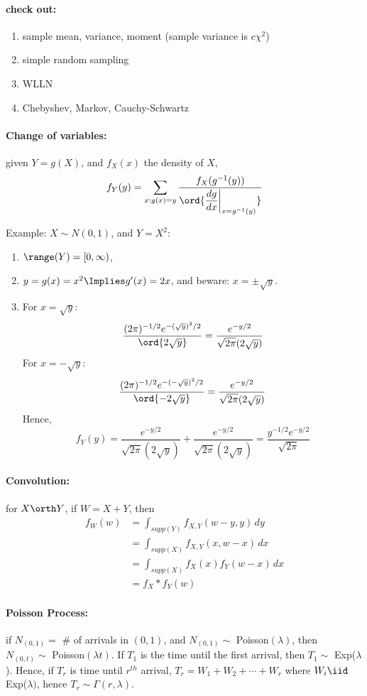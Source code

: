 \documentclass[10pt]{article}
\begin{document}
 \begin{multicols}{2}
\paragraph{check out:} 
\begin{enumerate}
\item sample mean, variance, moment (sample variance is $c \chi^{2}$)
\item simple random sampling
\item WLLN
\item Chebyshev, Markov, Cauchy-Schwartz
\end{enumerate}

\paragraph{Change of variables:} given $Y = g(X)$, and $f_{X}(x)$ the density of $X$, 
\[
f_{Y}(y) = \sum_{x : g(x) = y} \frac{f_{X}(g^{-1}(y))}{\ord{\dfrac{dg}{dx}\biggr|_{x=g^{-1}(y)}}}
\]

Example: $X \sim N(0,1)$, and $Y = X^2$:
\begin{enumerate}
\item $\range(Y) = [0,\infty)$,
\item $y=g(x) = x^2 \Implies g'(x) = 2x$, and beware: $x = \pm \sqrt{y}$.
\item For $x  = \sqrt{y}$:
\[
\frac{(2\pi)^{-1/2} e^{-(\sqrt{y})^2/2}}{\ord{2 \sqrt{y}}} = \frac{e^{-y/2}}{\sqrt{2\pi}(2\sqrt{y})}
\]
For $x = -\sqrt{y}$:
\[
 \frac{(2\pi)^{-1/2} e^{-(-\sqrt{y})^2/2}}{\ord{-2 \sqrt{y}}} = \frac{e^{-y/2}}{\sqrt{2\pi}(2\sqrt{y})}
\]
Hence,
\[
f_{Y}(y) = \frac{e^{-y/2}}{\sqrt{2\pi}(2\sqrt{y})} + \frac{e^{-y/2}}{\sqrt{2\pi}(2\sqrt{y})} = \frac{y^{-1/2}e^{-y/2}}{\sqrt{2\pi}} 
\]
\end{enumerate}

\paragraph{Convolution:} for $X \orth Y$, if $W = X+Y$, then
\begin{align*}
f_{W}(w) &= \int_{supp(Y)}f_{X,Y}(w-y,y) \, dy \\
 &= \int_{supp(X)}f_{X,Y}(x,w-x) \, dx \\
&= \int_{supp(X)}f_{X}(x)f_{Y}(w-x) \, dx \\
&= f_{X}*f_{Y}(w)
\end{align*}

\paragraph{Poisson Process:} if $N_{(0,1)} =$ \# of arrivals in $(0,1)$, and $N_{(0,1)} \sim$ Poisson$(\lambda)$, then $N_{(0,t)} \sim$ Poisson$(\lambda t)$. If $T_1$ is the time until the first arrival, then $T_1 \sim$ Exp($\lambda$). Hence, if $T_{r}$ is time until $r^{th}$ arrival, $T_r = W_1 + W_2 + \cdots + W_r$ where $W_i \iid$ Exp($\lambda)$, hence $T_{r} \sim \Gamma(r,\lambda)$.   


\end{multicols}
\end{document}
